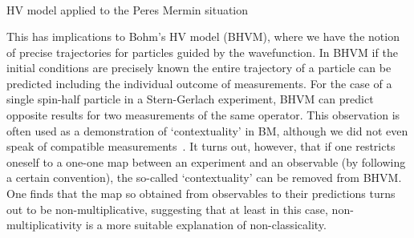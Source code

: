 \documentclass[british,aps,prl,superscriptaddress,nofootinbib,times,reprint]{revtex4-1}
\theoremstyle{plain}
\theoremstyle{plain}
\theoremstyle{definition}
\theoremstyle{remark}
\theoremstyle{remark}
\theoremstyle{remark}
\theoremstyle{plain}
\theoremstyle{plain}
\theoremstyle{plain}
\theoremstyle{definition}
\theoremstyle{definition}
\begin{document}
\begin{table}
\begin{equation*}
\begin{array}{ccc}

\label{eq:toyModel}
\end{array}
\end{equation*}
\caption{HV model applied to the Peres Mermin situation}
\label{tbl:HVmodel}
\end{table}
This has implications to Bohm's HV model (BHVM),
where we have the notion of precise trajectories
for particles guided by the wavefunction.  In BHVM
if the initial conditions are precisely known the
entire trajectory of a particle can be predicted
including the individual outcome of measurements.
For the case of a single spin-half particle in a
Stern-Gerlach experiment, BHVM can predict
opposite results for two measurements of the
same operator.  This observation is often used as
a demonstration of `contextuality' in BM, although
we did not even speak of compatible
measurements~\cite{HardyCntxBM}.  It turns out, however,
that if one restricts oneself to a one-one map
between an experiment and an observable (by
following a certain convention), the so-called
`contextuality' can be removed from BHVM.  One
finds that the map so obtained from observables to
their predictions turns out to be
non-multiplicative, suggesting that at least in
this case, non-multiplicativity is a more suitable
explanation of non-classicality.
\end{document}
